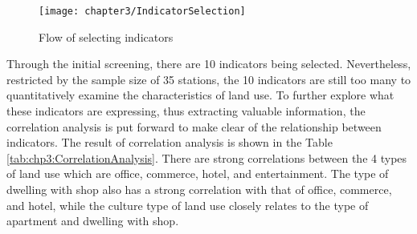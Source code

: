 %
\begin{figure}[htbp]
	\centering
	\texttt{[image: chapter3/IndicatorSelection]}
	\caption{Flow of selecting indicators}
	\label{fig:chp3:IndicatorSelection}
\end{figure}

%
Through the initial screening, there are 10 indicators being selected. Nevertheless, restricted by the sample size of 35 stations, the 10 indicators are still too many to quantitatively examine the characteristics of land use. To further explore what these indicators are expressing, thus extracting valuable information, the correlation analysis is put forward to make clear of the relationship between indicators. The result of correlation analysis is shown in the Table \ref{tab:chp3:CorrelationAnalysis}. There are strong correlations between the 4 types of land use which are office, commerce, hotel, and entertainment. The type of dwelling with shop also has a strong correlation with that of office, commerce, and hotel, while the culture type of land use closely relates to the type of apartment and dwelling with shop.

